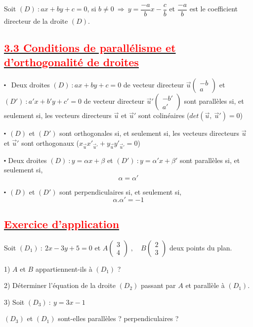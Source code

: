 \documentclass[12pt]{article}
\begin{document}
Soit $(D) \: : ax+by+c=0$, si $b\neq 0 \: \Rightarrow \: y=\dfrac{-a}{b}x-\dfrac{c}{b}$ et $\dfrac{-a}{b}$ est le coefficient directeur de la droite $(D).$
\subsection*{\underline{\textcolor{red}{\textbf{3.3 Conditions de parallélisme et d'orthogonalité de droites}}}}
$\centerdot\ \ $ Deux droites $(D) \: : ax+by+c=0$ de vecteur directeur $\vec{u}\begin{pmatrix} -b\\ a \end{pmatrix}$ et $(D') \: : a'x+b'y+c'=0$ de vecteur directeur $\vec{u}'\begin{pmatrix} -b'\\ a' \end{pmatrix}$ sont parallèles si, et seulement si, les vecteurs directeurs $\vec{u}$ et $\vec{u}'$ sont colinéaires ($det(\vec{u},\ \vec{u}')=0$)

$\centerdot\ \ (D)$ et $(D')$ sont orthogonales si, et seulement si, les vecteurs directeurs $\vec{u}$ et $\vec{u}'$ sont orthogonaux ($x_{\vec{u}}x'_{\vec{u}'}+y_{\vec{u}}y'_{\vec{u}'}=0$)

$\centerdot$ Deux droites $(D) \: : y=\alpha x+\beta$ et $(D') \: : y=\alpha' x+\beta'$ sont parallèles si, et seulement si, $$\alpha=\alpha'$$

$\centerdot\ \ (D)$ et $(D')$ sont perpendiculaires si, et seulement si, $$\alpha.\alpha'=-1$$
\subsection*{\underline{\textcolor{red}{\textbf{Exercice d'application}}}}
Soit $(D_{1})\ :\ 2x-3y+5=0$ et $A\begin{pmatrix} 3 \\ 4\end{pmatrix}\;,\quad B\begin{pmatrix} 2 \\ 3\end{pmatrix}$ deux points du plan.

1) $A$ et $B$ appartiennent-ils à $(D_{1})$ ?

2) Déterminer l'équation de la droite $(D_{2})$ passant par $A$ et parallèle à $(D_{1}).$

3) Soit $(D_{3})\ :\ y=3x-1$

$(D_{3})$ et $(D_{1})$ sont-elles parallèles ? perpendiculaires ?
\end{document}
